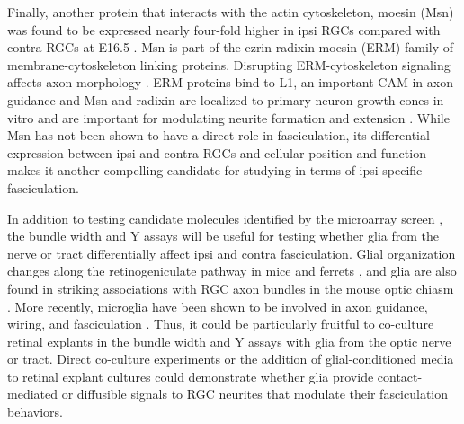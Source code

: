 Finally, another protein that interacts with the actin cytoskeleton, moesin (Msn) was found to be expressed nearly four-fold higher in ipsi RGCs compared with contra RGCs at E16.5 \cite{wang2016ipsilateral}.
Msn is part of the ezrin-radixin-moesin (ERM) family of membrane-cytoskeleton linking proteins.
Disrupting ERM-cytoskeleton signaling affects axon morphology \cite{dickson2002functional}.
ERM proteins bind to L1, an important CAM in axon guidance \cite{dickson2002functional} and Msn and radixin are localized to primary neuron growth cones in vitro and are important for modulating neurite formation and extension \cite{paglini1998suppression}.
While Msn has not been shown to have a direct role in fasciculation, its differential expression between ipsi and contra RGCs and cellular position and function makes it another compelling candidate for studying in terms of ipsi-specific fasciculation.

In addition to testing candidate molecules identified by the microarray screen \cite{wang2016ipsilateral}, the bundle width and Y assays will be useful for testing whether glia from the nerve or tract differentially affect ipsi and contra fasciculation.
Glial organization changes along the retinogeniculate pathway in mice \cite{colello1992observations} and ferrets \cite{guillery1987changing}, and glia are also found in striking associations with RGC axon bundles in the mouse optic chiasm \cite{colello1998changing}.
More recently, microglia have been shown to be involved in axon guidance, wiring, and fasciculation \cite{squarzoni2014microglia,pont2014microglia}.
Thus, it could be particularly fruitful to co-culture retinal explants in the bundle width and Y assays with glia from the optic nerve or tract.
Direct co-culture experiments or the addition of glial-conditioned media to retinal explant cultures could demonstrate whether glia provide contact-mediated or diffusible signals to RGC neurites that modulate their fasciculation behaviors.
%
